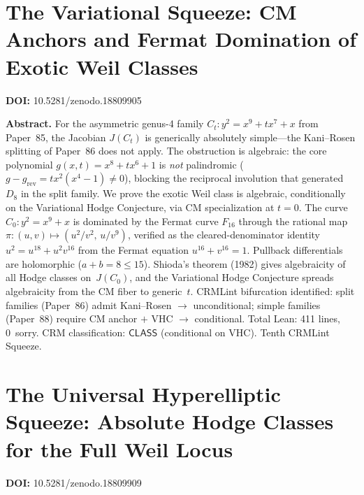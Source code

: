 \documentclass[11pt,a4paper]{article}
\begin{document}
\section{The Variational Squeeze: CM Anchors and Fermat Domination of Exotic Weil Classes}
\label{sec:p88}
\textbf{DOI:} 10.5281/zenodo.18809905

\bigskip
\noindent\textbf{Abstract.}
For the asymmetric genus-4 family $C_t\colon y^2 = x^9 + tx^7 + x$ from Paper~85, the Jacobian $J(C_t)$ is generically absolutely simple---the Kani--Rosen splitting of Paper~86 does not apply. The obstruction is algebraic: the core polynomial $g(x,t) = x^8 + tx^6 + 1$ is \emph{not} palindromic ($g - g_{\mathrm{rev}} = tx^2(x^4 - 1) \neq 0$), blocking the reciprocal involution that generated~$D_8$ in the split family. We prove the exotic Weil class is algebraic, conditionally on the Variational Hodge Conjecture, via CM specialization at $t = 0$. The curve $C_0\colon y^2 = x^9 + x$ is dominated by the Fermat curve $F_{16}$ through the rational map $\pi\colon (u,v) \mapsto (u^2/v^2,\, u/v^9)$, verified as the cleared-denominator identity $u^2 = u^{18} + u^2 v^{16}$ from the Fermat equation $u^{16} + v^{16} = 1$. Pullback differentials are holomorphic ($a + b = 8 \le 15$). Shioda's theorem (1982) gives algebraicity of all Hodge classes on~$J(C_0)$, and the Variational Hodge Conjecture spreads algebraicity from the CM fiber to generic~$t$. CRMLint bifurcation identified: split families (Paper~86) admit Kani--Rosen $\to$ unconditional; simple families (Paper~88) require CM anchor $+$ VHC $\to$ conditional. Total Lean: 411 lines, 0~sorry. CRM classification: $\mathsf{CLASS}$ (conditional on VHC). Tenth CRMLint Squeeze.

\section{The Universal Hyperelliptic Squeeze: Absolute Hodge Classes for the Full Weil Locus}
\label{sec:p89}
\textbf{DOI:} 10.5281/zenodo.18809909
\end{document}
